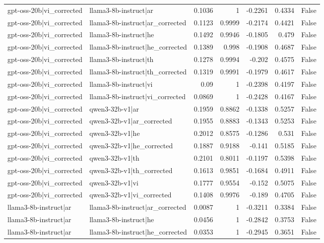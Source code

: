 \begin{table}
\begin{tabular}{l l r r r r l}
gpt-oss-20b|vi_corrected & llama3-8b-instruct|ar & 0.1036 & 1 & -0.2261 & 0.4334 & False \\
gpt-oss-20b|vi_corrected & llama3-8b-instruct|ar_corrected & 0.1123 & 0.9999 & -0.2174 & 0.4421 & False \\
gpt-oss-20b|vi_corrected & llama3-8b-instruct|he & 0.1492 & 0.9946 & -0.1805 & 0.479 & False \\
gpt-oss-20b|vi_corrected & llama3-8b-instruct|he_corrected & 0.1389 & 0.998 & -0.1908 & 0.4687 & False \\
gpt-oss-20b|vi_corrected & llama3-8b-instruct|th & 0.1278 & 0.9994 & -0.202 & 0.4575 & False \\
gpt-oss-20b|vi_corrected & llama3-8b-instruct|th_corrected & 0.1319 & 0.9991 & -0.1979 & 0.4617 & False \\
gpt-oss-20b|vi_corrected & llama3-8b-instruct|vi & 0.09 & 1 & -0.2398 & 0.4197 & False \\
gpt-oss-20b|vi_corrected & llama3-8b-instruct|vi_corrected & 0.0869 & 1 & -0.2428 & 0.4167 & False \\
gpt-oss-20b|vi_corrected & qwen3-32b-v1|ar & 0.1959 & 0.8862 & -0.1338 & 0.5257 & False \\
gpt-oss-20b|vi_corrected & qwen3-32b-v1|ar_corrected & 0.1955 & 0.8883 & -0.1343 & 0.5253 & False \\
gpt-oss-20b|vi_corrected & qwen3-32b-v1|he & 0.2012 & 0.8575 & -0.1286 & 0.531 & False \\
gpt-oss-20b|vi_corrected & qwen3-32b-v1|he_corrected & 0.1887 & 0.9188 & -0.141 & 0.5185 & False \\
gpt-oss-20b|vi_corrected & qwen3-32b-v1|th & 0.2101 & 0.8011 & -0.1197 & 0.5398 & False \\
gpt-oss-20b|vi_corrected & qwen3-32b-v1|th_corrected & 0.1613 & 0.9851 & -0.1684 & 0.4911 & False \\
gpt-oss-20b|vi_corrected & qwen3-32b-v1|vi & 0.1777 & 0.9554 & -0.152 & 0.5075 & False \\
gpt-oss-20b|vi_corrected & qwen3-32b-v1|vi_corrected & 0.1408 & 0.9976 & -0.189 & 0.4705 & False \\
llama3-8b-instruct|ar & llama3-8b-instruct|ar_corrected & 0.0087 & 1 & -0.3211 & 0.3384 & False \\
llama3-8b-instruct|ar & llama3-8b-instruct|he & 0.0456 & 1 & -0.2842 & 0.3753 & False \\
llama3-8b-instruct|ar & llama3-8b-instruct|he_corrected & 0.0353 & 1 & -0.2945 & 0.3651 & False \\

\end{tabular}
\end{table}
